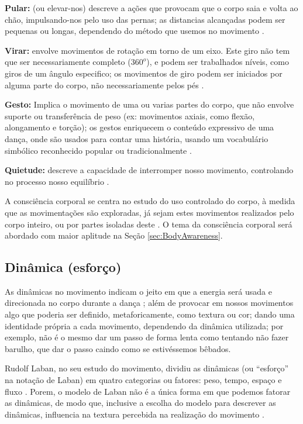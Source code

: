 \textbf{Pular:} (ou elevar-nos) descreve a ações que provocam que o corpo saia e volta ao chão,
impulsando-nos pelo uso das pernas; as distancias alcançadas podem ser pequenas ou longas,
dependendo do método que usemos no movimento  \cite[pp. 28]{paine2014complete}. 

\textbf{Virar:} envolve movimentos de rotação em torno de um eixo.
Este giro não tem que ser necessariamente completo ($360^o$),
e podem ser trabalhados níveis, como giros de um ângulo especifico;
os movimentos de giro podem ser iniciados por alguma parte do corpo, 
não necessariamente pelos pés \cite[pp. 29]{paine2014complete}.

\textbf{Gesto:} Implica o movimento de uma ou varias partes do corpo,
que não envolve suporte ou transferência de peso
(ex: movimentos axiais, como flexão, alongamento e torção);
os gestos enriquecem o conteúdo expressivo de uma dança,
onde são usados para contar uma história, 
usando um vocabulário simbólico reconhecido popular ou tradicionalmente 
\cite[pp. 29]{paine2014complete}.

\textbf{Quietude:} descreve a capacidade de interromper nosso movimento, 
controlando no processo nosso equilíbrio \cite[pp. 29]{paine2014complete}.


A consciência corporal se centra no estudo do uso controlado do corpo, 
à medida que as movimentações são exploradas,
já sejam  estes movimentos realizados pelo corpo inteiro,
ou por partes isoladas deste \cite[pp. 5]{carline2011lesson}.
O tema da consciência corporal será abordado com maior aplitude  na Seção \ref{sec:BodyAwareness}.


\subsection{Dinâmica (esforço)}
As dinâmicas no movimento 
indicam o jeito em que a energia será usada e direcionada no corpo durante a dança \cite[pp. 131, 136]{mccutchen2006teaching};
além de provocar em nossos movimentos algo que poderia ser definido, metaforicamente, como textura ou cor;
dando uma identidade própria a cada movimento, dependendo da dinâmica utilizada;
por exemplo, não é o mesmo dar um passo de forma lenta como tentando não fazer barulho,
que dar o passo caindo como se estivéssemos bêbados.

Rudolf Laban, no seu estudo do movimento, 
dividiu as dinâmicas (ou ``esforço'' na notação de Laban) 
em quatro categorias ou fatores: peso, tempo, espaço e fluxo 
\cite[pp. 5]{carline2011lesson}
\cite[pp. 30]{paine2014complete}.
Porem, o modelo de Laban não é a única forma em que podemos fatorar as dinâmicas,
de modo que, inclusive a escolha do modelo para descrever as dinâmicas,
influencia na textura percebida na realização do movimento \cite[pp. 30]{paine2014complete}. 

